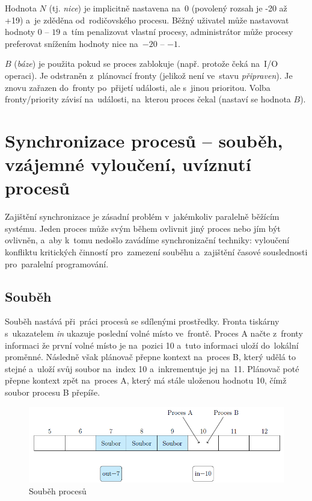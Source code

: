 Hodnota $N$ (tj. \emph{nice}) je implicitně nastavena na~0 (povolený rozsah je -20 až +19) a~je zděděna od~rodičovského procesu. Běžný uživatel může nastavovat hodnoty $0$ -- $19$ a~tím penalizovat vlastní procesy, administrátor může procesy preferovat snížením hodnoty nice na~$-20$ -- $-1$.

$B$ (\emph{báze}) je použita pokud se proces zablokuje (např. protože čeká na~I/O operaci). Je odstraněn z~plánovací fronty (jelikož není ve~stavu \emph{připraven}). Je znovu zařazen do~fronty po~přijetí události, ale s~jinou prioritou. Volba fronty/priority závisí na~události, na~kterou proces čekal (nastaví se hodnota $B$).

\clearpage
\section{Synchronizace procesů -- souběh, vzájemné vyloučení, uvíznutí procesů}
\label{sync}

Zajištění synchronizace je zásadní problém v~jakémkoliv paralelně běžícím systému. Jeden proces může svým během ovlivnit jiný proces nebo jím být ovlivněn, a~aby k~tomu nedošlo zavádíme synchronizační techniky: vyloučení konfliktu kritických činností pro~zamezení souběhu a~zajištění časové souslednosti pro~paralelní programování.

\subsection{Souběh}

Souběh nastává při~práci procesů se sdílenými prostředky. Fronta tiskárny s~ukazatelem \emph{in} ukazuje poslední volné místo ve~frontě. Proces A načte z~fronty informaci že první volné místo je na~pozici 10 a~tuto informaci uloží do~lokální proměnné. Následně však plánovač přepne kontext na~proces B, který udělá to stejné a~uloží svůj soubor na~index 10 a~inkrementuje jej na~11. Plánovač poté přepne kontext zpět na~proces A, který má stále uloženou hodnotu 10, čímž soubor procesu B přepíše.

\begin{figure}[ht]
	\centering
	\includegraphics[width=\textwidth]{images/proc_soubeh.png}
	\caption{Souběh procesů}
	\label{proc_soubeh}
\end{figure}

